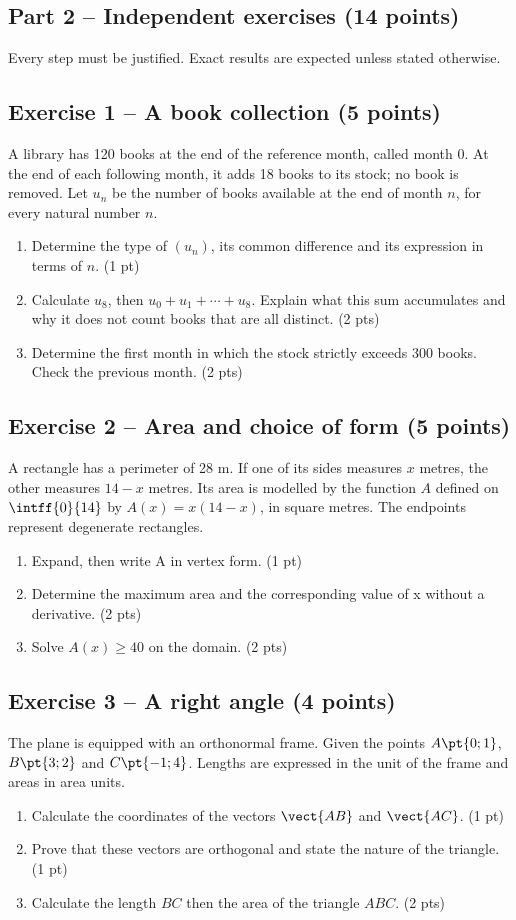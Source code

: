 \mxnewpage\subsection*{Part 2 -- Independent exercises (14 points)}
Every step must be justified. Exact results are expected unless stated otherwise.
\subsection*{Exercise 1 -- A book collection (5 points)}
A library has 120 books at the end of the reference month, called month 0. At the end of each following month, it adds 18 books to its stock; no book is removed. Let $u_n$ be the number of books available at the end of month $n$, for every natural number $n$.
\begin{enumerate}
\item Determine the type of $(u_n)$, its common difference and its expression in terms of $n$. \hfill(1 pt)
\item Calculate $u_8$, then $u_0+u_1+\cdots+u_8$. Explain what this sum accumulates and why it does not count books that are all distinct. \hfill(2 pts)
\item Determine the first month in which the stock strictly exceeds 300 books. Check the previous month. \hfill(2 pts)
\end{enumerate}
\subsection*{Exercise 2 -- Area and choice of form (5 points)}
A rectangle has a perimeter of 28 m. If one of its sides measures $x$ metres, the other measures $14-x$ metres. Its area is modelled by the function $A$ defined on $\intff{0}{14}$ by $A(x)=x(14-x)$, in square metres. The endpoints represent degenerate rectangles.
\begin{enumerate}
\item Expand, then write A in vertex form. \hfill(1 pt)
\item Determine the maximum area and the corresponding value of x without a derivative. \hfill(2 pts)
\item Solve $A(x)\geq40$ on the domain. \hfill(2 pts)
\end{enumerate}
\subsection*{Exercise 3 -- A right angle (4 points)}
The plane is equipped with an orthonormal frame. Given the points $A\pt{0;1}$, $B\pt{3;2}$ and $C\pt{-1;4}$. Lengths are expressed in the unit of the frame and areas in area units.
\begin{enumerate}
\item Calculate the coordinates of the vectors $\vect{AB}$ and $\vect{AC}$. \hfill(1 pt)
\item Prove that these vectors are orthogonal and state the nature of the triangle. \hfill(1 pt)
\item Calculate the length $BC$ then the area of the triangle $ABC$. \hfill(2 pts)
\end{enumerate}

